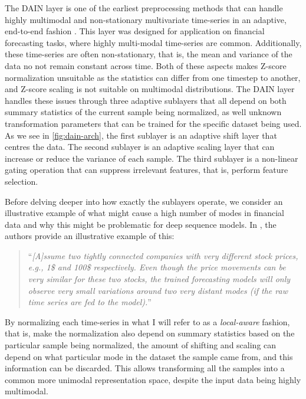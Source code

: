 \documentclass{statsmsc}
\begin{document}
{The \ac{DAIN} layer is one of the earliest preprocessing methods that can
handle highly multimodal and non-stationary multivariate time-series in an adaptive,
end-to-end fashion \cite{dain}.
This layer was designed for application on financial forecasting tasks, where highly multi-modal
time-series are common. Additionally, these time-series are often non-stationary, that is, the
mean and variance of the data no not remain constant across time.
Both of these aspects makes Z-score normalization unsuitable as the statistics can differ
from one timestep to another, and Z-score scaling is not suitable on multimodal distributions.
The \ac{DAIN} layer handles these issues through three adaptive sublayers that all depend
on both summary statistics of the current sample being normalized, as well unknown transformation
parameters that can be trained for the specific dataset being used.
As we see in \cref{fig:dain-arch}, the first sublayer is an adaptive shift layer
that centres the data. The second sublayer is an adaptive scaling layer that can increase or
reduce the variance of each sample. The third sublayer is a non-linear gating operation
that can suppress irrelevant features, that is, perform feature selection.

Before delving deeper into how exactly the sublayers operate, we consider an illustrative
example of what might cause a high number of modes in financial data and why this might
be problematic for deep sequence models. In
\cite{dain}, the authors provide an illustrative example of this:
\begin{quote}
    ``\textit{[A]ssume two tightly
    connected companies with very different stock prices, e.g., 1\$
    and 100\$ respectively. Even though the price movements can
    be very similar for these two stocks, the trained forecasting
    models will only observe very small variations around two
    very distant modes (if the raw time series are fed to the model).}''
\end{quote}
By normalizing each time-series in what I will refer to as a
\textit{local-aware} fashion, that is, make the normalization also depend on summary statistics
based on the particular sample being normalized,
the amount of shifting and scaling can depend on what particular mode in the dataset the sample
came from, and this information can be discarded. This allows transforming all the samples into
a common more unimodal representation space, despite the input data being highly multimodal.

}
\end{document}
